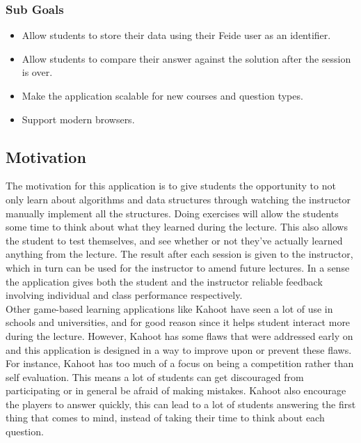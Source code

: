 \subsubsection{Sub Goals}
\begin{itemize}
\item Allow students to store their data using their Feide user as an identifier.
\item Allow students to compare their answer against the solution after the session is over.
\item Make the application scalable for new courses and question types.
\item Support modern browsers.
\end{itemize}

\subsection{Motivation}
The motivation for this application is to give students the opportunity to not only learn about algorithms and data structures through watching the instructor manually implement all the structures. Doing exercises will allow the students some time to think about what they learned during the lecture. This also allows the student to test themselves, and see whether or not they've actually learned anything from the lecture. The result after each session is given to the instructor, which in turn can be used for the instructor to amend future lectures. In a sense the application gives both the student and the instructor reliable feedback involving individual and class performance respectively.
\\[11pt]
Other game-based learning applications like Kahoot have seen a lot of use in schools and universities, and for good reason since it helps student interact more during the lecture. However, Kahoot has some flaws that were addressed early on and this application is designed in a way to improve upon or prevent these flaws. For instance, Kahoot has too much of a focus on being a competition rather than self evaluation. This means a lot of students can get discouraged from participating or in general be afraid of making mistakes. Kahoot also encourage the players to answer quickly, this can lead to a lot of students answering the first thing that comes to mind, instead of taking their time to think about each question.

